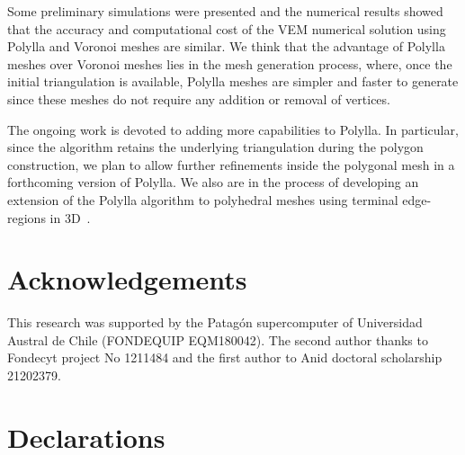 \documentclass[lineno,pdflatex,sn-mathphys]{sn-jnl}%
\theoremstyle{thmstyleone}%
\theoremstyle{thmstyletwo}%
\theoremstyle{thmstylethree}%
\begin{document}
Some preliminary simulations were presented and the numerical results showed that the accuracy and computational cost of the VEM numerical solution using Polylla and Voronoi meshes are similar. We  think that the advantage of Polylla meshes over Voronoi meshes lies in the mesh generation process, where, once the initial triangulation is available, Polylla meshes are simpler and faster to generate since these meshes do not require any addition or removal of vertices.


The ongoing work is devoted to adding more capabilities to Polylla. In particular, since the algorithm retains the underlying triangulation during the polygon construction, we plan to allow further refinements inside the polygonal mesh in a forthcoming version of Polylla. We also are in the process of developing an extension of the Polylla algorithm to polyhedral meshes using  terminal edge-regions in 3D~\cite{HerviasHCF13}.



\section{Acknowledgements}
This research was supported by the Patagón supercomputer of Universidad Austral de Chile (FONDEQUIP EQM180042). The second author thanks to Fondecyt project No 1211484 and the first author to Anid doctoral scholarship 21202379.
\section*{Declarations}
\end{document}
